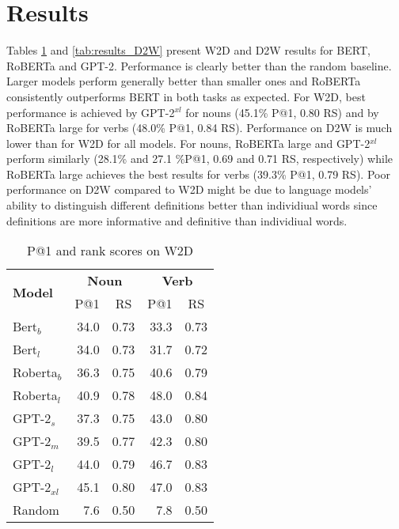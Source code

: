 \documentclass[11pt,a4paper]{article}
\begin{document}
\section{Results}

Tables \ref{tab:results_W2D} and 
\ref{tab:results_D2W} present
W2D and D2W
results for
BERT, RoBERTa and GPT-2. Performance is clearly better than the
random baseline.
Larger models perform generally better than smaller
ones and RoBERTa consistently outperforms BERT in both tasks as expected. For W2D,
best performance is achieved by GPT-2$^{xl}$  for 
nouns (45.1\% P@1, 0.80 RS) and by RoBERTa large
for  verbs (48.0\% P@1, 0.84 RS). Performance on D2W is much lower than for W2D for all models. For nouns, RoBERTa large and GPT-2$^{xl}$ perform similarly (28.1\% and 27.1 \%P@1, 0.69 and 0.71 RS, respectively) while RoBERTa large achieves the best results for verbs (39.3\% P@1, 0.79 RS).
Poor performance on D2W compared to W2D might be due to language models' ability to distinguish different definitions better than individiual words since definitions are more informative and definitive than individiual words. 


\begin{table}
    \centering
    \begin{tabular}{l|rrrr}
        \hline
         \multirow{2}{*}{\textbf{Model}} & \multicolumn{2}{c}{\textbf{Noun}} & \multicolumn{2}{c}{\textbf{Verb}} \\
         & \multicolumn{1}{c}{P@1} & \multicolumn{1}{c}{RS} & \multicolumn{1}{c}{P@1} & \multicolumn{1}{c}{RS} \\ \hline
     Bert$_{b}$ & 34.0 & 0.73 & 33.3 & 0.73 \\
     Bert$_{l}$ & 34.0 & 0.73 & 31.7 & 0.72 \\
     Roberta$_{b}$ & 36.3 & 0.75 & 40.6 & 0.79 \\
     Roberta$_{l}$ & 40.9 & 0.78 & 48.0 & 0.84 \\ \hline
     GPT-2$_{s}$ & 37.3 & 0.75 & 43.0 & 0.80 \\
     GPT-2$_{m}$ & 39.5 & 0.77 & 42.3 & 0.80 \\
     GPT-2$_{l}$ & 44.0 & 0.79 & 46.7 & 0.83 \\
     GPT-2$_{xl}$ & 45.1 & 0.80 & 47.0 & 0.83 \\ \hline 
     Random & 7.6 & 0.50 & 7.8 & 0.50 \\\hline
     
    \end{tabular}
    \caption{P@1 and rank scores on W2D}
    \label{tab:results_W2D}
\end{table}
\end{document}
